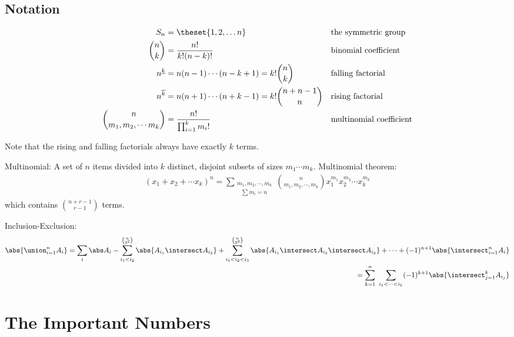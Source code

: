\hypertarget{notation-4}{%
\subsection{Notation}\label{notation-4}}

\begin{align*}
S_n                                & = \theset{1,2,\ldots n}                                   &  & \text{the symmetric group} \\
{n\choose k}                       & = \frac{n!}{k!(n-k)!}                                     &  & \text{binomial coefficient}\\
n^{\underline k}                   & = n(n-1) \cdots (n-k+1) = k!{n\choose k}                  &  & \text{falling factorial}\\
n^{\overline k}                    & = n(n+1) \cdots (n+k-1) = k!{n + n - 1 \choose n}         &  & \text{rising factorial}\\
{n \choose {m_1, m_2, \cdots m_k}} & = \frac{n!}{\prod_{i=1}^k m_i!}                           &  & \text{multinomial coefficient}
\end{align*}

Note that the rising and falling factorials always have exactly \(k\)
terms.

Multinomial: A set of \(n\) items divided into \(k\) distinct, disjoint
subsets of sizes \(m_1 \cdots m_k\). Multinomial theorem:
\begin{align*}
(x_1 + x_2 + \cdots x_k )^n 
= \sum_{\substack{m_1, m_2, \cdots, m_k \\ ~~~\sum m_i = n}} 
{n \choose m_1,m_2,\cdots, m_k}
x_1^{m_1}x_2^{m_2}\cdots x_k^{m_k}
\end{align*} which contains \(n + r - 1 \choose r - 1\) terms.

Inclusion-Exclusion:
\begin{align*}
\abs{\union_{i=1}^n A_i} 
= \sum_i \abs A_i - \sum_{i_1 < i_2}^{n\choose 2^2} \abs{A_{i_1} \intersect A_{i_2}} + 
\sum_{i_1 < i_2 < i_3}^{n \choose 2^3} \abs{A_{i_1} \intersect A_{i_2} \intersect A_{i_3}} + 
\cdots +(-1)^{n+1} \abs{\intersect_{i=1}^n A_i} \\ 
= \sum_{k=1}^n ~\sum_{i_1 < \cdots < i_k}  (-1)^{k+1} \abs{\intersect_{j=1}^k A_{i_j}}
\end{align*}

\hypertarget{the-important-numbers}{%
\section{The Important Numbers}\label{the-important-numbers}}

